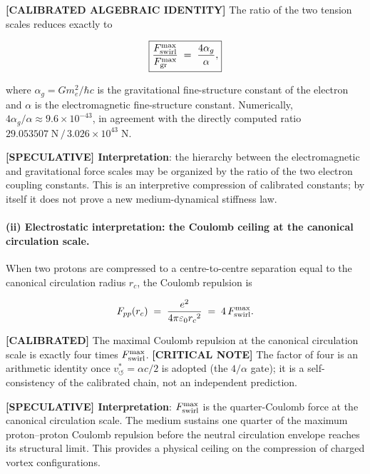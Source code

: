 \documentclass[11pt]{article}
\theoremstyle{definition}
\theoremstyle{plain}
\theoremstyle{remark}
\newcommand{\rc}{{r_c}}
\newcommand{\vchar}{v_{\!\boldsymbol{\circlearrowleft}}^{\ast}}
\begin{document}
        \textbf{[CALIBRATED ALGEBRAIC IDENTITY]} The ratio of the two tension scales reduces exactly to

        \begin{align}
            \boxed{
            \frac{F_{\rm swirl}^{\max}}{F_{\rm gr}^{\max}}
            \;=\; \frac{4\alpha_g}{\alpha},
            }
            \label{eq:Fmax_ratio}
        \end{align}

        where $\alpha_g = Gm_e^2/\hbar c$ is the gravitational fine-structure constant of the electron and $\alpha$ is the electromagnetic fine-structure constant. Numerically, $4\alpha_g/\alpha \approx 9.6\times10^{-43}$, in agreement with the directly computed ratio $29.053507\;\text{N}\,/\,3.026\times10^{43}\;\text{N}$.

        \textbf{[SPECULATIVE] Interpretation}: the hierarchy between the electromagnetic and gravitational force scales may be organized by the ratio of the two electron coupling constants. This is an interpretive compression of calibrated constants; by itself it does not prove a new medium-dynamical stiffness law.

        \paragraph{(ii) Electrostatic interpretation: the Coulomb ceiling at the canonical circulation scale.}

        When two protons are compressed to a centre-to-centre separation equal to the canonical circulation radius $\rc$, the Coulomb repulsion is

        \begin{align}
            F_{pp}(\rc)
            \;=\; \frac{e^2}{4\pi\varepsilon_0 \rc^2}
            \;=\; 4\,F_{\rm swirl}^{\max}.
            \label{eq:Coulomb_core}
        \end{align}

        \textbf{[CALIBRATED]} The maximal Coulomb repulsion at the canonical circulation scale is exactly four times $F_{\rm swirl}^{\max}$. \textbf{[CRITICAL NOTE]} The factor of four is an arithmetic identity once $\vchar=\alpha c/2$ is adopted (the $4/\alpha$ gate); it is a self-consistency of the calibrated chain, not an independent prediction.

        \textbf{[SPECULATIVE] Interpretation}: $F_{\rm swirl}^{\max}$ is the quarter-Coulomb force at the canonical circulation scale. The medium sustains one quarter of the maximum proton--proton Coulomb repulsion before the neutral circulation envelope reaches its structural limit. This provides a physical ceiling on the compression of charged vortex configurations.
\end{document}

